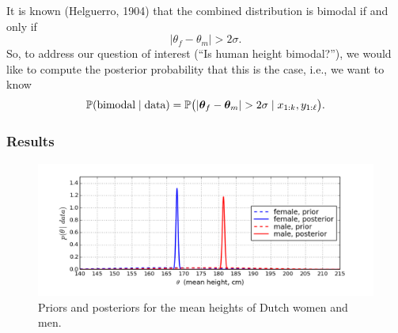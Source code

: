 \documentclass[12pt]{article}
\begin{document}
It is known (Helguerro, 1904) that the combined distribution is bimodal if and only if
$$ |\theta_f-\theta_m|>2\sigma. $$
So, to address our question of interest (``Is human height bimodal?''), we would like to compute the posterior probability that this is the case, i.e., we want to know
$$ \Pr(\text{bimodal}\mid \text{data}) = \Pr\big(|\btheta_f-\btheta_m|>2\sigma \mid x_{1:k},y_{1:\ell}\big).$$


\subsubsection*{Results}

\begin{figure}
  \begin{center}
    \includegraphics[width=1\textwidth]{heights-prior-posterior.png}
  \end{center}
  \caption{Priors and posteriors for the mean heights of Dutch women and men.}
  \label{figure:heights-prior-posterior}
\end{figure}
\end{document}
